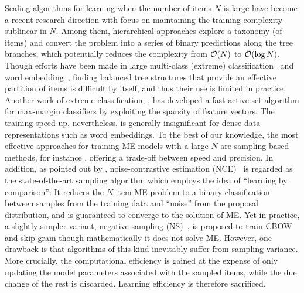 Scaling algorithms for learning when the number of items $N$ is large have
become a recent research direction with focus on maintaining the training
complexity sublinear in $N$.  Among them, hierarchical approaches explore a
taxonomy (of items) and convert the problem into a series of binary predictions
along the tree branches, which potentially reduces the complexity from $\mathcal{O}(N)$
to $\mathcal{O}(\log N)$. Though efforts have been made in large multi-class (extreme)
classification~\cite{choromanska2015logarithmic,choromanska2013extreme} and word
embedding~\cite{morin2005hierarchical,mnih2009scalable,mikolov2013efficient},
finding balanced tree structures that provide an effective partition of items is
difficult by itself, and thus their use is limited in practice. Another work of
extreme classification, \cite{YenHRZD16}, has developed a fast active set
algorithm for max-margin classifiers by exploiting the sparsity of feature
vectors. The training speed-up, nevertheless, is generally insignificant for
dense data representations such as word embeddings. To the best of our
knowledge, the most effective approaches for training ME models with a large $N$
are sampling-based methods, for instance \cite{bengio2008adaptive}, offering a
trade-off between speed and precision. In addition, as pointed out by
\cite{mnih2012fast}, noise-contrastive estimation (NCE)~\cite{gutmann2010noise}
is regarded as the state-of-the-art sampling algorithm which employs the idea of
``learning by comparison'': It reduces the $N$-item ME problem to a binary
classification between samples from the training data and ``noise'' from the
proposal distribution, and is guaranteed to converge to the solution of ME. Yet
in practice, a slightly simpler variant, negative sampling
(NS)~\cite{mikolov2013distributed}, is proposed to train CBOW and skip-gram
though mathematically it does not solve ME. However, one drawback is that
algorithms of this kind inevitably suffer from sampling variance. More
crucially, the computational efficiency is gained at the expense of only
updating the model parameters associated with the sampled items, while the due
change of the rest is discarded. Learning efficiency is therefore sacrificed.


